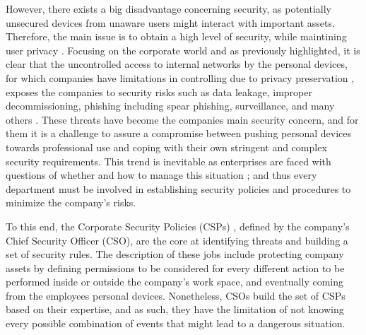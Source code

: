 \documentclass[a4paper,10pt,twocolumn,preprint,3p]{elsarticle}
\begin{document}
However, there exists a big disadvantage concerning security, as
potentially unsecured devices from unaware users might interact with
important assets. Therefore, the main issue is to obtain a high level
of security, while maintining user privacy \cite{miller2012byod}.%
Focusing on the corporate world and as previously highlighted, %
it is clear that the uncontrolled access to internal networks by the
personal devices, for which companies have limitations in
controlling due to privacy preservation \cite{miller2012byod}, exposes the companies to security risks such as data
leakage, improper decommissioning, phishing including spear phishing, surveillance, and many
others \cite{lennon2012changing}. These threats have become the
companies main security concern, and for them it is a challenge to
assure a compromise between pushing personal devices towards
professional use and coping with their own stringent and complex
security requirements. This trend is inevitable as enterprises are
faced with questions of whether and how to manage this situation \cite{thomson2012byod}; and
thus every department must be involved in establishing security
policies and procedures to minimize the company's risks.

To this end, the Corporate Security Policies (CSPs) \cite{Kaeo:2003:DNS:1201807}, %
defined by the company's Chief Security Officer (CSO), are the core at
identifying threats and building a set of security rules. The description of these jobs include protecting
company assets by defining permissions to be considered for every
different action to be performed inside or outside the company's work
space, and eventually coming from the employees personal
devices. Nonetheless, CSOs build the set of CSPs based on their
expertise, and as such, they have the limitation of not knowing every
possible combination of events that might lead to a dangerous
situation. 
\end{document}
